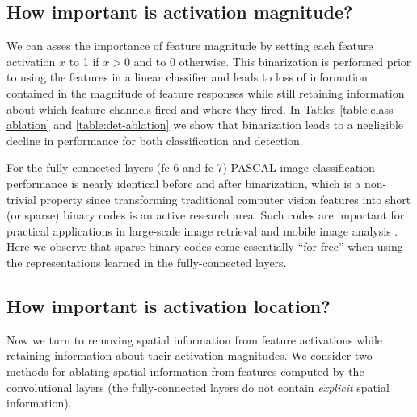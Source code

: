 \subsection{How important is activation magnitude?}
\label{sub:imp-mag}
\setlength{\tabcolsep}{2pt}
\begin{table}[t!]
\begin{center}
\caption{Percentage non-zeros (sparsity) in features of various layers of CNN.}
\label{table:sparse}
\end{center}
\end{table}
\setlength{\tabcolsep}{1.4pt}

We can asses the importance of feature magnitude by setting each feature activation $x$ to 1 if $x > 0$ and to $0$ otherwise. This binarization is performed prior to using the features in a linear classifier and leads to loss of information contained in the magnitude of feature responses while still retaining information about which feature channels fired and where they fired. 
In Tables \ref{table:class-ablation} and \ref{table:det-ablation} we show that binarization leads to a negligible decline in performance for both classification and detection. 

For the fully-connected layers (fc-6 and fc-7) PASCAL image classification performance is nearly identical before and after binarization, which is a non-trivial property since transforming traditional computer vision features into short (or sparse) binary codes is an active research area. Such codes are important for practical applications in large-scale image retrieval and mobile image analysis . Here we observe that sparse binary codes come essentially ``for free'' when using the representations learned in the fully-connected layers.

\subsection{How important is activation location?}
\label{sub:imp-loc}
Now we turn to removing spatial information from feature activations while retaining information about their activation magnitudes. We consider two methods for ablating spatial information from features computed by the convolutional layers (the fully-connected layers do not contain \emph{explicit} spatial information).

